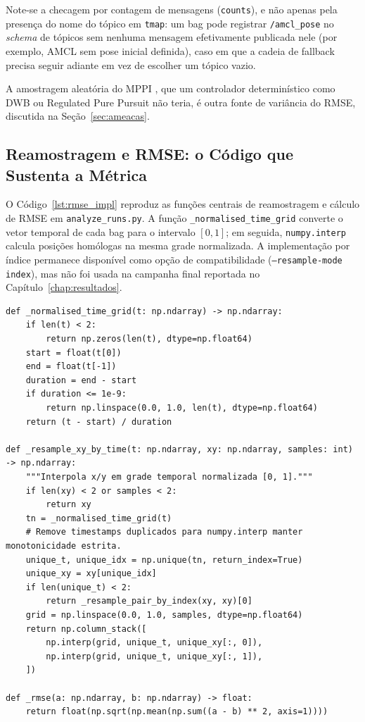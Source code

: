 Note-se a checagem por contagem de mensagens (\texttt{counts}), e não apenas
pela presença do nome do tópico em \texttt{tmap}: um bag pode registrar
\texttt{/amcl\_\allowbreak pose} no \textit{schema} de tópicos sem nenhuma mensagem efetivamente
publicada nele (por exemplo, AMCL sem pose inicial definida), caso em que a
cadeia de fallback precisa seguir adiante em vez de escolher um tópico vazio.

A amostragem aleatória do MPPI \cite{williams2016}, que um controlador
determinístico como DWB \cite{fox1997} ou Regulated Pure Pursuit
\cite{macenski2023survey} não teria, é outra fonte de variância do RMSE, discutida
na Seção~\ref{sec:ameacas}.

\subsection{Reamostragem e RMSE: o Código que Sustenta a Métrica}
\label{sec:impl_rmse_codigo}

O Código~\ref{lst:rmse_impl} reproduz as funções centrais de reamostragem e
cálculo de RMSE \cite{thrun2005} em \texttt{analyze\_\allowbreak runs.py}. A função
\texttt{\_\allowbreak normalised\_\allowbreak time\_\allowbreak grid} converte o vetor temporal de cada bag
para o intervalo $[0,1]$; em seguida, \texttt{numpy.interp} calcula posições
homólogas na mesma grade normalizada. A implementação por índice permanece
disponível como opção de compatibilidade (\texttt{--resample-mode index}), mas
não foi usada na campanha final reportada no Capítulo~\ref{chap:resultados}.

\begin{lstlisting}[style=pycode, float=tbp, caption={Reamostragem temporal normalizada e RMSE pairwise (\texttt{scripts/\allowbreak analyze\_\allowbreak runs.py}).}, label={lst:rmse_impl}]
def _normalised_time_grid(t: np.ndarray) -> np.ndarray:
    if len(t) < 2:
        return np.zeros(len(t), dtype=np.float64)
    start = float(t[0])
    end = float(t[-1])
    duration = end - start
    if duration <= 1e-9:
        return np.linspace(0.0, 1.0, len(t), dtype=np.float64)
    return (t - start) / duration

def _resample_xy_by_time(t: np.ndarray, xy: np.ndarray, samples: int) -> np.ndarray:
    """Interpola x/y em grade temporal normalizada [0, 1]."""
    if len(xy) < 2 or samples < 2:
        return xy
    tn = _normalised_time_grid(t)
    # Remove timestamps duplicados para numpy.interp manter monotonicidade estrita.
    unique_t, unique_idx = np.unique(tn, return_index=True)
    unique_xy = xy[unique_idx]
    if len(unique_t) < 2:
        return _resample_pair_by_index(xy, xy)[0]
    grid = np.linspace(0.0, 1.0, samples, dtype=np.float64)
    return np.column_stack([
        np.interp(grid, unique_t, unique_xy[:, 0]),
        np.interp(grid, unique_t, unique_xy[:, 1]),
    ])

def _rmse(a: np.ndarray, b: np.ndarray) -> float:
    return float(np.sqrt(np.mean(np.sum((a - b) ** 2, axis=1))))
\end{lstlisting}

